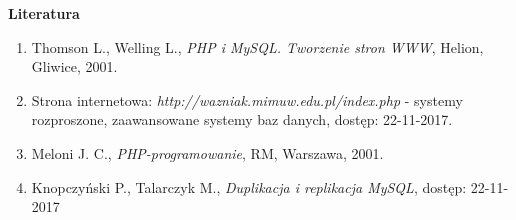 \pagestyle {empty}

\vspace*{1.3cm}

{\Huge\textbf{Literatura}}

\vspace*{1cm}

\begin{enumerate}[\lbrack 1\rbrack]
	\item Thomson L., Welling L., \textit{PHP i MySQL. Tworzenie stron WWW}, Helion, Gliwice, 2001.
	\item Strona internetowa: \textit{http://wazniak.mimuw.edu.pl/index.php} - systemy rozproszone, zaawansowane
	systemy baz danych, dostęp: 22-11-2017. 
	\item Meloni J. C., \textit{PHP-programowanie}, RM, Warszawa, 2001.
	\item Knopczyński P., Talarczyk M., \textit{Duplikacja i replikacja MySQL}, dostęp: 22-11-2017
\end{enumerate}

